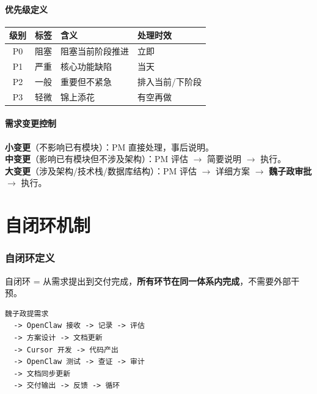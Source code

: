 \documentclass[11pt,a4paper]{article}
\begin{document}
\subsection{优先级定义}

\begin{table}[h]
\centering
\begin{tabular}{clll}
\toprule
\textbf{级别} & \textbf{标签} & \textbf{含义} & \textbf{处理时效} \\
\midrule
P0 & \textcolor{danger}{阻塞} & 阻塞当前阶段推进 & 立即 \\
P1 & \textcolor{warning}{严重} & 核心功能缺陷 & 当天 \\
P2 & 一般 & 重要但不紧急 & 排入当前/下阶段 \\
P3 & 轻微 & 锦上添花 & 有空再做 \\
\bottomrule
\end{tabular}
\end{table}

\subsection{需求变更控制}

\textbf{小变更}（不影响已有模块）：PM 直接处理，事后说明。\\
\textbf{中变更}（影响已有模块但不涉及架构）：PM 评估 $\to$ 简要说明 $\to$ 执行。\\
\textbf{大变更}（涉及架构/技术栈/数据库结构）：PM 评估 $\to$ 详细方案 $\to$ \textbf{魏子政审批} $\to$ 执行。

\part{自闭环机制}

\section{自闭环定义}

自闭环 = 从需求提出到交付完成，\textbf{所有环节在同一体系内完成}，不需要外部干预。

\begin{lstlisting}
魏子政提需求
  -> OpenClaw 接收 -> 记录 -> 评估
  -> 方案设计 -> 文档更新
  -> Cursor 开发 -> 代码产出
  -> OpenClaw 测试 -> 查证 -> 审计
  -> 文档同步更新
  -> 交付输出 -> 反馈 -> 循环
\end{lstlisting}
\end{document}
